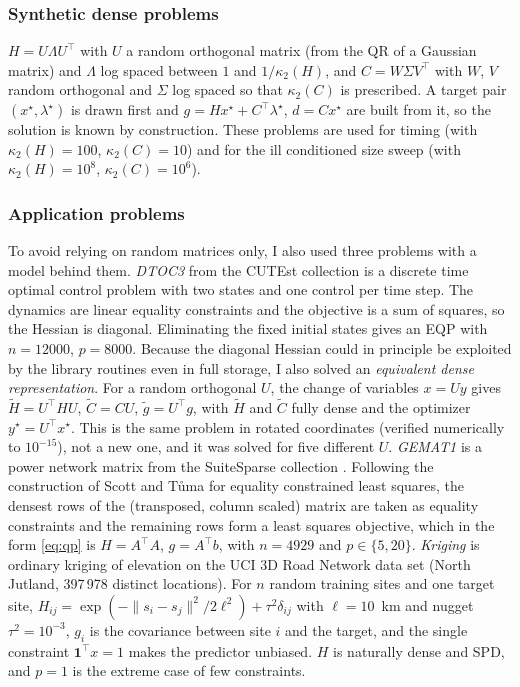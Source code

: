 \documentclass[10pt]{article}
\newcommand{\kap}{\kappa_2}
\begin{document}
\subsubsection*{Synthetic dense problems} $H=U\Lambda U^\top$ with $U$ a random orthogonal
matrix (from the QR of a Gaussian matrix) and $\Lambda$ log spaced between $1$ and
$1/\kap(H)$, and $C=W\Sigma V^\top$ with $W$, $V$ random orthogonal and $\Sigma$ log spaced so
that $\kap(C)$ is prescribed. A target pair $(x^\star,\lambda^\star)$ is drawn first and
$g=Hx^\star+C^\top\lambda^\star$, $d=Cx^\star$ are built from it, so the solution is known by
construction. These problems are used for timing (with $\kap(H)=100$, $\kap(C)=10$) and
for the ill conditioned size sweep (with $\kap(H)=10^8$, $\kap(C)=10^6$).

\subsubsection*{Application problems} To avoid relying on random matrices only, I also
used three problems with a model behind them. \emph{DTOC3} from the CUTEst collection
\cite{cutest,dtoc3} is a discrete time optimal control problem with two states and one
control per time step. The dynamics are linear equality constraints and the objective is
a sum of squares, so the Hessian is diagonal. Eliminating the fixed initial states gives
an EQP with $n=12000$, $p=8000$. Because the diagonal Hessian could in principle be
exploited by the library routines even in full storage, I also solved an \emph{equivalent
dense representation}. For a random orthogonal $U$, the change of variables $x=Uy$ gives
$\tilde H=U^\top HU$, $\tilde C=CU$, $\tilde g=U^\top g$, with $\tilde H$ and $\tilde C$
fully dense and the optimizer $y^\star=U^\top x^\star$. This is the same problem in rotated
coordinates (verified numerically to $10^{-15}$), not a new one, and it was solved for
five different $U$. \emph{GEMAT1} is a power network matrix from the SuiteSparse
collection \cite{suitesparse}. Following the construction of Scott and T\r{u}ma
\cite{scotttuma2022} for equality constrained least squares, the densest rows of the
(transposed, column scaled) matrix are taken as equality constraints and the remaining
rows form a least squares objective, which in the form \eqref{eq:qp} is $H=A^\top A$,
$g=A^\top b$, with $n=4929$ and $p\in\{5,20\}$. \emph{Kriging} is ordinary kriging of
elevation on the UCI 3D Road Network data set \cite{uci_road} (North Jutland, 397\,978
distinct locations). For $n$ random training sites and one target site, $H_{ij}=\exp(-\|s_i-s_j\|^2/2\ell^2)+\tau^2\delta_{ij}$
with $\ell=10$~km and nugget $\tau^2=10^{-3}$, $g_i$ is the covariance between site $i$ and
the target, and the single constraint $\mathbf 1^\top x=1$ makes the predictor unbiased.
$H$ is naturally dense and SPD, and $p=1$ is the extreme case of few constraints.
\end{document}
